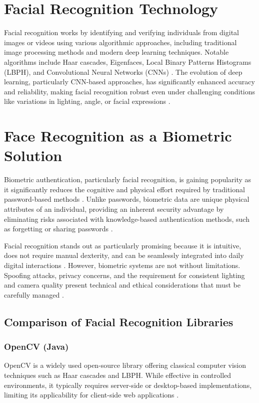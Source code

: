 \section{Facial Recognition Technology}
Facial recognition works by identifying and verifying individuals from digital images or videos using various algorithmic approaches, including traditional image processing methods and modern deep learning techniques. Notable algorithms include Haar cascades, Eigenfaces, Local Binary Patterns Histograms (LBPH), and Convolutional Neural Networks (CNNs) \autocite{ElSayed2015}. The evolution of deep learning, particularly CNN-based approaches, has significantly enhanced accuracy and reliability, making facial recognition robust even under challenging conditions like variations in lighting, angle, or facial expressions \autocite{Zhang2020}.

\section{Face Recognition as a Biometric Solution}
Biometric authentication, particularly facial recognition, is gaining popularity as it significantly reduces the cognitive and physical effort required by traditional password-based methods \autocite{Furnell2022}. 
Unlike passwords, biometric data are unique physical attributes of an individual, providing an inherent security advantage by eliminating risks associated with knowledge-based authentication methods, 
such as forgetting or sharing passwords \autocite{Pant2022}.

Facial recognition stands out as particularly promising because it is intuitive, does not require manual dexterity, and can be seamlessly integrated into daily digital interactions \autocite{Bhatt2011}. However, biometric systems are not without limitations. Spoofing attacks, privacy concerns, and the requirement for consistent lighting and camera quality present technical and ethical considerations that must be carefully managed \autocite{Kuznetsov2024, Bahia2024}.


\subsection{Comparison of Facial Recognition Libraries}

\subsubsection{OpenCV (Java)}
OpenCV is a widely used open-source library offering classical computer vision techniques such as Haar cascades and LBPH. While effective in controlled environments, it typically requires server-side or desktop-based implementations, limiting its applicability for client-side web applications \autocite{Dominguez2017}.

